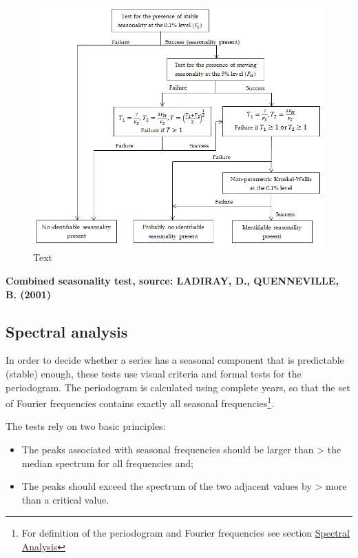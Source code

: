 \documentclass[
  letterpaper,
  DIV=11,
  numbers=noendperiod]{scrreprt}
\begin{document}
\begin{figure}

{\centering \includegraphics{./All_images/UG_A_image18.png}

}

\caption{Text}

\end{figure}

\textbf{Combined seasonality test, source: LADIRAY, D., QUENNEVILLE, B.
(2001)}

\hypertarget{spectral-analysis}{%
\subsection{Spectral analysis}\label{spectral-analysis}}

In order to decide whether a series has a seasonal component that is
predictable (stable) enough, these tests use visual criteria and formal
tests for the periodogram. The periodogram is calculated using complete
years, so that the set of Fourier frequencies contains exactly all
seasonal frequencies\footnote{For definition of the periodogram and
  Fourier frequencies see section
  \href{../theory/spectral.html}{Spectral Analysis}}.

The tests rely on two basic principles:

\begin{itemize}
\item
  The peaks associated with seasonal frequencies should be larger than
  \textgreater{} the median spectrum for all frequencies and;
\item
  The peaks should exceed the spectrum of the two adjacent values by
  \textgreater{} more than a critical value.
\end{itemize}
\end{document}
